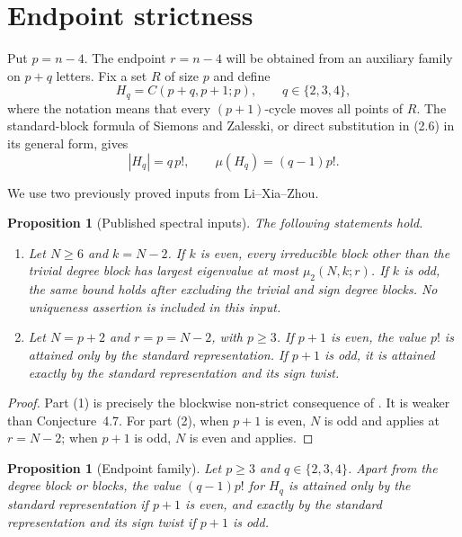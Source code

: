 \documentclass[11pt]{article}
\newtheorem{proposition}[theorem]{Proposition}
\theoremstyle{definition}
\begin{document}
\section{Endpoint strictness}

Put $p=n-4$.  The endpoint $r=n-4$ will be obtained from an auxiliary
family on $p+q$ letters.  Fix a set $R$ of size $p$ and define
\[
 H_q=C(p+q,p+1;p),\qquad q\in\{2,3,4\},
 \tag{4.1}
\]
where the notation means that every $(p+1)$-cycle moves all points of $R$.
The standard-block formula of Siemons and Zalesski, or direct substitution
in (2.6) in its general form, gives
\[
 |H_q|=q\,p!,\qquad \mu(H_q)=(q-1)p!.
 \tag{4.2}
\]

We use two previously proved inputs from Li--Xia--Zhou.

\begin{proposition}[Published spectral inputs]\label{prop:inputs}
The following statements hold.
\begin{enumerate}
\item Let $N\geq6$ and $k=N-2$.  If $k$ is even, every irreducible block
other than the trivial degree block has largest eigenvalue at most
$\mu_2(N,k;r)$.  If $k$ is odd, the same bound holds after excluding the
trivial and sign degree blocks.  No uniqueness assertion is included in
this input.
\item Let $N=p+2$ and $r=p=N-2$, with $p\geq3$.  If $p+1$ is even, the
value $p!$ is attained only by the standard representation.  If $p+1$ is
odd, it is attained exactly by the standard representation and its sign
twist.
\end{enumerate}
\end{proposition}

\begin{proof}
Part (1) is precisely the blockwise non-strict consequence of
\cite[Theorems~4.4 and~4.6]{LiXiaZhou2026}.  It is weaker than
Conjecture~4.7.  For part (2), when $p+1$ is even, $N$ is odd and
\cite[Theorem~3.3(d)]{LiXiaZhou2026} applies at $r=N-2$; when $p+1$ is odd,
$N$ is even and \cite[Theorem~3.5(b.2)]{LiXiaZhou2026} applies.
\end{proof}

\begin{proposition}[Endpoint family]\label{prop:endpoint}
Let $p\geq3$ and $q\in\{2,3,4\}$.  Apart from the degree block or blocks,
the value $(q-1)p!$ for $H_q$ is attained only by the standard
representation if $p+1$ is even, and exactly by the standard representation
and its sign twist if $p+1$ is odd.
\end{proposition}
\end{document}
